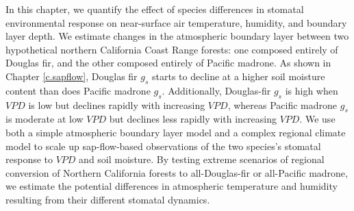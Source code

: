 In this chapter, we quantify the effect of species differences in stomatal environmental response on near-surface air temperature, humidity, and boundary layer depth.  We estimate changes in the atmospheric boundary layer between two hypothetical northern California Coast Range forests: one composed entirely of Douglas fir, and the other composed entirely of Pacific madrone.  As shown in Chapter \ref{c.sapflow}, Douglas fir $g_s$ starts to decline at a higher soil moisture content than does Pacific madrone $g_s$.  Additionally, Douglas-fir $g_s$ is high when $VPD$ is low but declines rapidly with increasing $VPD$, whereas Pacific madrone $g_s$ is moderate at low $VPD$ but declines less rapidly with increasing $VPD$.  We use both a simple atmospheric boundary layer model and a complex regional climate model to scale up sap-flow-based observations of the two species's stomatal response to $VPD$ and soil moisture.  By testing extreme scenarios of regional conversion of Northern California forests to all-Douglas-fir or all-Pacific madrone, we estimate the potential differences in atmospheric temperature and humidity resulting from their different stomatal dynamics.
